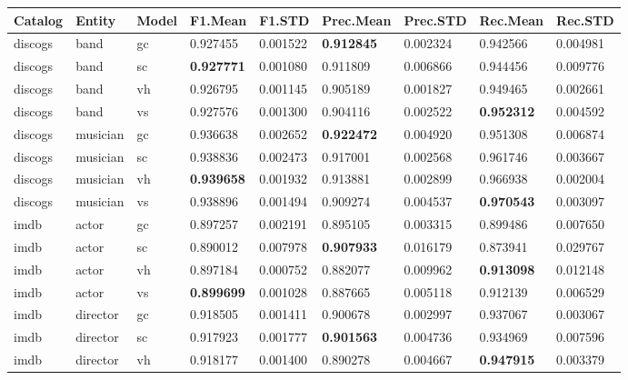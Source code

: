 \documentclass[epsfig,a4paper,11pt,titlepage,twoside,openany]{book}
\begin{document}
\begin{longtable}{|l|l|l|l|l|l|l|l|l|}
\hline
Catalog                      & Entity                    & Model & F1.Mean           & F1.STD   & Prec.Mean         & Prec.STD & Rec.Mean          & Rec.STD  \\ \hline
discogs  & band     & gc    & 0.927455          & 0.001522 & \textbf{0.912845} & 0.002324 & 0.942566          & 0.004981 \\
discogs  & band     & sc    & \textbf{0.927771} & 0.001080 & 0.911809          & 0.006866 & 0.944456          & 0.009776 \\
discogs  & band     & vh    & 0.926795          & 0.001145 & 0.905189          & 0.001827 & 0.949465          & 0.002661 \\
discogs  & band     & vs    & 0.927576          & 0.001300 & 0.904116          & 0.002522 & \textbf{0.952312} & 0.004592 \\ \hline
discogs  & musician & gc    & 0.936638          & 0.002652 & \textbf{0.922472} & 0.004920 & 0.951308          & 0.006874 \\
discogs  & musician & sc    & 0.938836          & 0.002473 & 0.917001          & 0.002568 & 0.961746          & 0.003667 \\
discogs  & musician & vh    & \textbf{0.939658} & 0.001932 & 0.913881          & 0.002899 & 0.966938          & 0.002004 \\
discogs  & musician & vs    & 0.938896          & 0.001494 & 0.909274          & 0.004537 & \textbf{0.970543} & 0.003097 \\ \hline
imdb & actor    & gc    & 0.897257          & 0.002191 & 0.895105          & 0.003315 & 0.899486          & 0.007650 \\
imdb & actor    & sc    & 0.890012          & 0.007978 & \textbf{0.907933} & 0.016179 & 0.873941          & 0.029767 \\
imdb & actor    & vh    & 0.897184          & 0.000752 & 0.882077          & 0.009962 & \textbf{0.913098} & 0.012148 \\
imdb & actor    & vs    & \textbf{0.899699} & 0.001028 & 0.887665          & 0.005118 & 0.912139          & 0.006529 \\ \hline 
imdb & director & gc    & 0.918505          & 0.001411 & 0.900678          & 0.002997 & 0.937067          & 0.003067 \\
imdb & director & sc    & 0.917923          & 0.001777 & \textbf{0.901563} & 0.004736 & 0.934969          & 0.007596 \\
imdb & director & vh    & 0.918177          & 0.001400 & 0.890278          & 0.004667 & \textbf{0.947915} & 0.003379 \\

\end{longtable}
\end{document}
